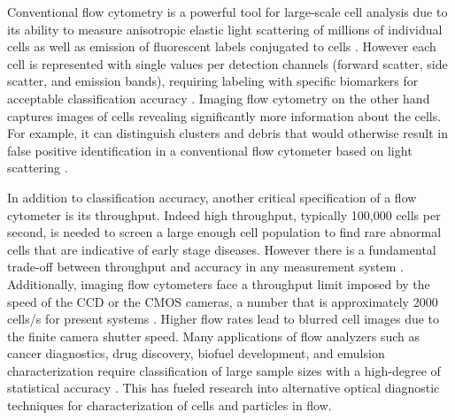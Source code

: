 \documentclass[aps,pra,reprint,longbibliography,superscriptaddress]{revtex4-1}
\begin{document}

Conventional flow cytometry is a powerful tool for large-scale cell analysis due to its ability to measure anisotropic elastic light scattering of millions of individual cells as well as emission of fluorescent labels conjugated to cells \cite{shapiro2005practical,watson2004introduction}. However each cell is represented with single values per detection channels (forward scatter, side scatter, and emission bands), requiring labeling with specific biomarkers for acceptable classification accuracy \cite{shapiro2005practical,perfetto2004seventeen}. Imaging flow cytometry \cite{basiji2007cellular,basiji2001imaging} on the other hand captures images of cells revealing significantly more information about the cells. For example, it can distinguish clusters and debris that would otherwise result in false positive identification in a conventional flow cytometer based on light scattering \cite{carpenter2006cellprofiler}.

In addition to classification accuracy, another critical specification of a flow cytometer is its throughput. Indeed high throughput, typically 100,000 cells per second, is needed to screen a large enough cell population to find rare abnormal cells that are indicative of early stage diseases. However there is a fundamental trade-off between throughput and accuracy in any measurement system \cite{razavi1995principles,mahjoubfar2013optically}. Additionally, imaging flow cytometers face a throughput limit imposed by the speed of the CCD or the CMOS cameras, a number that is approximately 2000 cells/s for present systems \cite{goda2012high}. Higher flow rates lead to blurred cell images due to the finite camera shutter speed. Many applications of flow analyzers such as cancer diagnostics, drug discovery, biofuel development, and emulsion characterization require classification of large sample sizes with a high-degree of statistical accuracy \cite{zanella2010high}. This has fueled research into alternative optical diagnostic techniques for characterization of cells and particles in flow.
\end{document}
